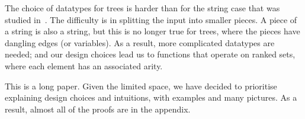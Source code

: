 The choice of datatypes for trees is harder than for the string case that was studied in~\cite{bojanczykRegularFirstOrderList2018}.  The difficulty is in splitting the input into smaller pieces. A piece of a string is also a string, but this is no longer true for trees, where the pieces have dangling edges (or variables). As a result, more complicated  datatypes are needed; and our design choices lead us to functions that operate on ranked sets, where each element has an associated arity.
 


This is a long paper. Given the limited space, we have decided to prioritise  explaining  design choices and intuitions, with  examples and many pictures. As a result, almost all of the proofs are in the appendix. 



